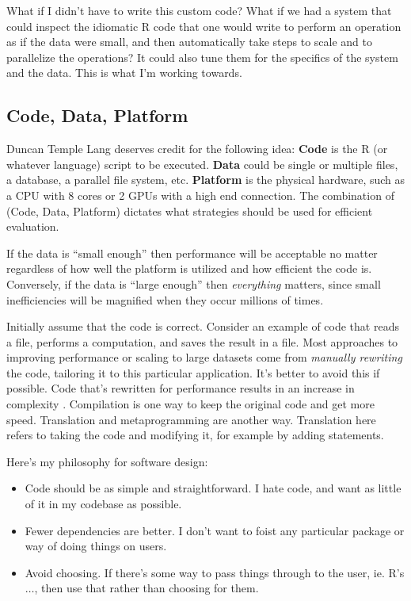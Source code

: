 \documentclass[12pt]{article}
\begin{document}
What if I didn't have to write this custom code? What if we had a system
that could inspect the idiomatic R code that one would write to perform an
operation as if the data were small, and then automatically take steps to
scale and to parallelize the operations? It could also tune them for the
specifics of the system and the data. This is what I'm working towards.

\subsection{Code, Data, Platform}

Duncan Temple Lang deserves credit for the following idea:
\textbf{Code} is the R (or whatever language) script to be executed.
\textbf{Data} could be single or multiple files, a database, a parallel
file system, etc.  \textbf{Platform} is the physical hardware, such as a
CPU with 8 cores or 2 GPUs with a high end connection. The combination of
(Code, Data, Platform) dictates what strategies should be used for
efficient evaluation.

If the data is ``small enough'' then performance will be acceptable no
matter regardless of how well the platform is utilized and how efficient
the code is. Conversely, if the data is ``large enough'' then
\emph{everything} matters, since small inefficiencies will be magnified
when they occur millions of times.

Initially assume that the code is correct. Consider an example of code that
reads a file, performs a computation, and saves the result in a file.
Most approaches to improving performance or scaling to large datasets
come from \emph{manually rewriting} the code, tailoring it to this
particular application. It's better to avoid this if possible.  Code that's
rewritten for performance results in an increase in complexity
\cite{matloff2015parallel}.  Compilation is one way to keep the original
code and get more speed. Translation and metaprogramming are another way.
Translation here refers to taking the code and modifying it, for example by
adding statements.


Here's my philosophy for software design:

\begin{itemize}
    \item Code should be as simple and straightforward. I hate code, and want as
        little of it in my codebase as possible.
    \item Fewer dependencies are better. I don't want to foist any
        particular package or way of doing things on users.
    \item Avoid choosing. If there's some way to pass things through to the
        user, ie. R's $\dots$, then use that rather than choosing for them.
\end{itemize}
\end{document}
